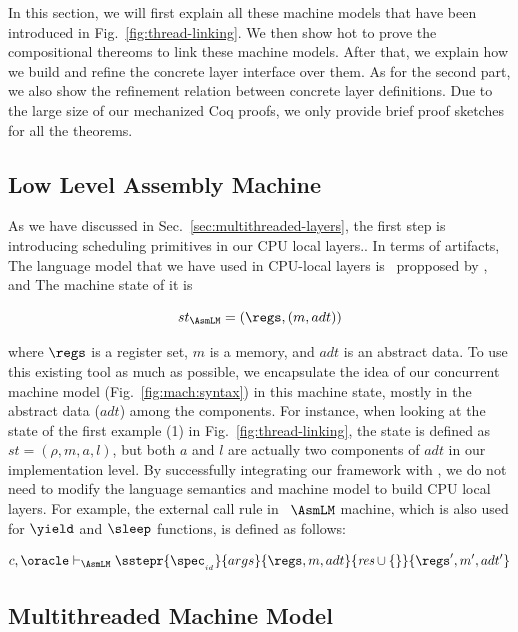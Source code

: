 In this section, we will first explain  all these machine models that have been introduced in Fig.~\ref{fig:thread-linking}.
We then show hot to prove the compositional thereoms to link these machine models. 
After that, we  explain how we build and refine the concrete layer interface over  them. 
As for the second part, we also show the refinement relation between concrete layer definitions.
Due to the large size of our mechanized Coq proofs, we only provide brief proof sketches for all the theorems.


\subsection{Low Level Assembly Machine}\label{subsec:lowlevelasm}

As we have discussed in Sec.~\ref{sec:multithreaded-layers}, 
the first step is introducing scheduling primitives in our CPU local layers..
In terms of artifacts, 
The language model that we have used in CPU-local layers is \compcertx\ propposed by \cite{dscal15}, and 
The machine state of it is
\begin{small}
\[
st_{\AsmLM} = (\regs, (m, adt))
\]
\end{small} 
where $\regs$ is a register set, $m$ is a memory, and $adt$ is an abstract data.
To use this existing tool as much as possible, we encapsulate the idea of 
our concurrent machine model (Fig.~\ref{fig:mach:syntax}) in this machine state, 
mostly in the abstract data ($adt$) among the components.
For instance, when looking at the state of the first example (1) in Fig.~\ref{fig:thread-linking}, the state is defined as $st = (\rho, m, a, l)$, but both $a$ and $l$ are actually two components of $adt$ in our implementation level.
By successfully integrating our framework with \compcertx, we do not need to modify the language semantics and machine model
to build CPU local layers.
For example, the external call rule in \compcertx\ $\AsmLM$ machine, 
which is also used for $\yield$ and $\sleep$ functions,  
is defined as follows:
\begin{small}
\[
c, \oracle \vdash_{\AsmLM} \sstepr{\spec_{_{id}}}{args}{\regs, m, adt}{\textit{res}\cup \{\}}{\regs',  m', adt'}
\]
\end{small} 

\subsection{Multithreaded Machine Model}\label{subsec:fulleasm}

